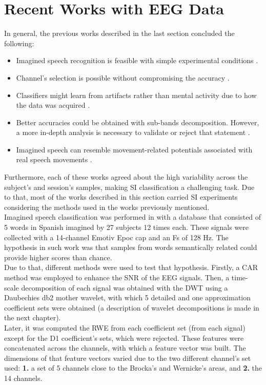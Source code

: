 \section{Recent Works with EEG Data}
In general, the previous works described in the last section concluded the following:
\begin{itemize}
	\item Imagined speech recognition is feasible with simple experimental conditions \cite{suppes1997brain}.
	\item Channel's selection is possible without compromising the accuracy \cite{marek}.
	\item Classifiers might learn from artifacts rather than mental activity due to how the data was acquired \cite{porbadnigk2009eeg}.
	\item Better accuracies could be obtained with sub-bands decomposition. However, a more in-depth analysis is necessary to validate or reject that statement \cite{d2009toward}.
	\item Imagined speech can resemble movement-related potentials associated with real speech movements \cite{dasalla2009spatial}.
\end{itemize}

Furthermore, each of these works agreed about the high variability across the subject's and session's samples, making SI classification a challenging task. Due to that, most of the works described in this section carried SI experiments considering the methods used in the works previously mentioned.\\

Imagined speech classification was performed in \cite{torres2013analisis} with a database that consisted of 5 words in Spanish imagined by 27 subjects 12 times each. These signals were collected with a 14-channel Emotiv Epoc cap and an Fs of 128 Hz. The hypothesis in such work was that samples from words semantically related could provide higher scores than chance.\\

Due to that, different methods were used to test that hypothesis. Firstly, a CAR method was employed to enhance the SNR of the EEG signals. Then, a time-scale decomposition of each signal was obtained with the DWT using a Daubechies db2 mother wavelet, with which 5 detailed and one approximation coefficient sets were obtained (a description of wavelet decompositions is made in the next chapter).\\

Later, it was computed the RWE from each coefficient set (from each signal) except for the D1 coefficient's sets, which were rejected. These features were concatenated across the channels, with which a feature vector was built. The dimensions of that feature vectors varied due to the two different channel's set used: \textbf{1.} a set of 5 channels close to the Brocka's and Wernicke's areas, and \textbf{2.} the 14 channels.\\

